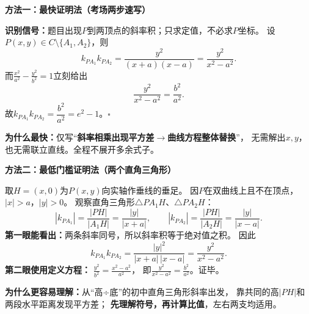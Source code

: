 \clearpage
\begin{proofbox}
\textbf{\textcolor{CProof}{方法一：最快证明法（考场两步速写）}}
\begin{center}\end{center}


\textbf{识别信号：}题目出现\(P\)到两顶点的斜率积；只求定值，不必求\(P\)坐标。
设\(P(x,y)\in C\setminus\{A_1,A_2\}\)，则
\[
\boxed{k_{PA_1}k_{PA_2}=\frac{y^2}{(x+a)(x-a)}
 =\frac{y^2}{x^2-a^2}}.
\]
而\(\displaystyle\frac{x^2}{a^2}-\frac{y^2}{b^2}=1\)立刻给出
\[
\boxed{\frac{y^2}{x^2-a^2}=\frac{b^2}{a^2}}.
\]
故\(k_{PA_1}k_{PA_2}=\dfrac{b^2}{a^2}=e^2-1\)。\quad\(\square\)

\textbf{为什么最快：}仅写“\textbf{斜率相乘出现平方差}\(\to\)\textbf{曲线方程整体替换}”，
无需解出\(x,y\)，也无需联立直线。全程不展开多余式子。

\medskip
\end{proofbox}
\clearpage
\begin{proofbox}
\textbf{\textcolor{CProof}{方法二：最低门槛证明法（两个直角三角形）}}
\begin{center}\end{center}


取\(H=(x,0)\)为\(P(x,y)\)向实轴作垂线的垂足。
因\(P\)在双曲线上且不在顶点，\(|x|>a\)，\(|y|>0\)。
观察直角三角形\(\triangle PA_1H\)、\(\triangle PA_2H\)：
\[
 |k_{PA_1}|=\frac{|PH|}{|A_1H|}=\frac{|y|}{|x+a|},\qquad
 |k_{PA_2}|=\frac{|PH|}{|A_2H|}=\frac{|y|}{|x-a|}.
\]
\textbf{第一眼能看出：}两条斜率同号，所以斜率积等于绝对值之积。
因此
\[
 k_{PA_1}k_{PA_2}
 =\frac{|y|^2}{|x+a|\,|x-a|}
 =\frac{y^2}{x^2-a^2}.
\]
\textbf{第二眼使用定义方程：}
\(\frac{y^2}{b^2}=\frac{x^2-a^2}{a^2}\)，
即\(\frac{y^2}{x^2-a^2}=\frac{b^2}{a^2}\)。证毕。

\textbf{为什么更容易理解：}从“高÷底”的初中直角三角形斜率出发，
靠共同的高\(|PH|\)和两段水平距离发现平方差；
\textbf{先理解符号，再计算比值}，左右两支均适用。

\medskip
\end{proofbox}

